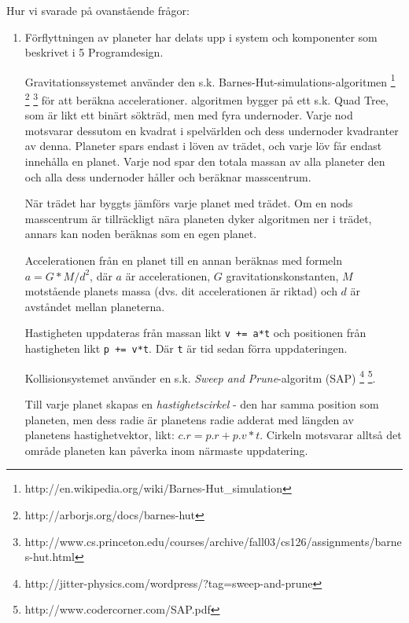 
Hur vi svarade på ovanstående frågor:
\begin{enumerate}
    \item Förflyttningen av planeter har delats upp i system och komponenter
        som beskrivet i 5 Programdesign.

        \vspace{6pt}

        Gravitationssystemet använder den s.k.
        Barnes-Hut-simulations-algoritmen
        \footnote{http://en.wikipedia.org/wiki/Barnes-Hut\_simulation}
        \footnote{http://arborjs.org/docs/barnes-hut}
        \footnote{http://www.cs.princeton.edu/courses/archive/fall03/cs126/assignments/barnes-hut.html}
        för att beräkna accelerationer.
        algoritmen bygger på ett s.k. Quad Tree, som är likt ett
        binärt sökträd, men med fyra undernoder.
        Varje nod motsvarar dessutom en kvadrat i spelvärlden och
        dess undernoder kvadranter av denna.
        Planeter spars endast i löven av trädet, och varje löv
        får endast innehålla en planet.
        Varje nod spar den totala massan av alla planeter den och
        alla dess undernoder håller och beräknar masscentrum.

        När trädet har byggts jämförs varje planet med trädet.
        Om en nods masscentrum är tillräckligt nära planeten
        dyker algoritmen ner i trädet, annars kan noden beräknas
        som en egen planet.

        Accelerationen från en planet till en annan beräknas med
        formeln $a = G*M/d^2$, där $a$ är accelerationen, $G$
        gravitationskonstanten, $M$ motstående planets massa (dvs.
        dit accelerationen är riktad) och $d$ är avståndet mellan
        planeterna.

        Hastigheten uppdateras från massan likt \verb#v += a*t#
        och positionen från hastigheten likt \verb#p += v*t#.
        Där \verb#t# är tid sedan förra uppdateringen.

        \vspace{12pt}

        Kollisionsystemet använder en s.k.
        \textit{Sweep and Prune}-algoritm (SAP)
        \footnote{http://jitter-physics.com/wordpress/?tag=sweep-and-prune}
        \footnote{http://www.codercorner.com/SAP.pdf}.


	
        Till varje planet skapas en \textit{hastighetscirkel} - 
        den har samma position som planeten, men dess radie
        är planetens radie adderat med längden av planetens hastighetvektor,
        likt: $c.r = p.r + p.v * t$.
        Cirkeln motsvarar alltså det område planeten kan påverka
        inom närmaste uppdatering.


\end{enumerate}
